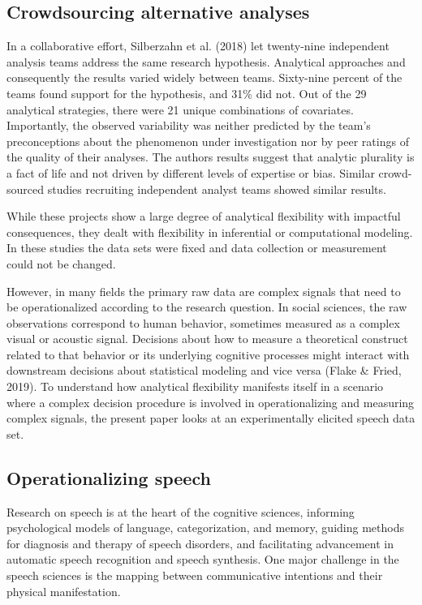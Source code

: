 \documentclass[
  english,
  man,floatsintext]{apa6}
\begin{document}
\hypertarget{crowdsourcing-alternative-analyses}{%
\subsection{Crowdsourcing alternative analyses}\label{crowdsourcing-alternative-analyses}}

In a collaborative effort, Silberzahn et al. (2018) let twenty-nine independent analysis teams address the same research hypothesis.
Analytical approaches and consequently the results varied widely between teams.
Sixty-nine percent of the teams found support for the hypothesis, and 31\% did not.
Out of the 29 analytical strategies, there were 21 unique combinations of covariates.
Importantly, the observed variability was neither predicted by the team's preconceptions about the phenomenon under investigation nor by peer ratings of the quality of their analyses.
The authors results suggest that analytic plurality is a fact of life and not driven by different levels of expertise or bias.
Similar crowd-sourced studies recruiting independent analyst teams showed similar results.

While these projects show a large degree of analytical flexibility with impactful consequences, they dealt with flexibility in inferential or computational modeling.
In these studies the data sets were fixed and data collection or measurement could not be changed.

However, in many fields the primary raw data are complex signals that need to be operationalized according to the research question.
In social sciences, the raw observations correspond to human behavior, sometimes measured as a complex visual or acoustic signal.
Decisions about how to measure a theoretical construct related to that behavior or its underlying cognitive processes might interact with downstream decisions about statistical modeling and vice versa (Flake \& Fried, 2019).
To understand how analytical flexibility manifests itself in a scenario where a complex decision procedure is involved in operationalizing and measuring complex signals, the present paper looks at an experimentally elicited speech data set.

\hypertarget{operationalizing-speech}{%
\subsection{Operationalizing speech}\label{operationalizing-speech}}

Research on speech is at the heart of the cognitive sciences, informing psychological models of language, categorization, and memory, guiding methods for diagnosis and therapy of speech disorders, and facilitating advancement in automatic speech recognition and speech synthesis. One major challenge in the speech sciences is the mapping between communicative intentions and their physical manifestation.
\end{document}
